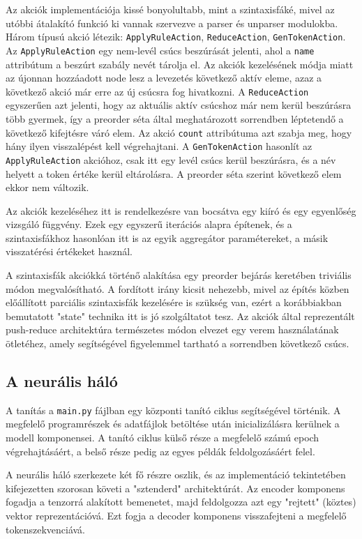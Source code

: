 \documentclass[twoside, 12pt]{report}
\begin{document}
Az akciók implementációja kissé bonyolultabb, mint a szintaxisfáké, mivel az utóbbi átalakító funkció ki vannak szervezve a parser és unparser modulokba. Három típusú akció létezik: \verb|ApplyRuleAction|, \verb|ReduceAction|, \verb|GenTokenAction|. Az \verb|ApplyRuleAction| egy nem-levél csúcs beszúrását jelenti, ahol a \verb|name| attribútum a beszúrt szabály nevét tárolja el. Az akciók kezelésének módja miatt az újonnan hozzáadott node lesz a levezetés következő aktív eleme, azaz a következő akció már erre az új csúcsra fog hivatkozni. A \verb|ReduceAction| egyszerűen azt jelenti, hogy az aktuális aktív csúcshoz már nem kerül beszúrásra több gyermek, így a preorder séta által meghatározott sorrendben léptetendő a következő kifejtésre váró elem. Az akció \verb|count| attribútuma azt szabja meg, hogy hány ilyen visszalépést kell végrehajtani. A \verb|GenTokenAction| hasonlít az \verb|ApplyRuleAction| akcióhoz, csak itt egy levél csúcs kerül beszúrásra, és a név helyett a token értéke kerül eltárolásra. A preorder séta szerint következő elem ekkor nem változik.

Az akciók kezeléséhez itt is rendelkezésre van bocsátva egy kiíró és egy egyenlőség vizsgáló függvény. Ezek egy egyszerű iterációs alapra építenek, és a szintaxisfákhoz hasonlóan itt is az egyik aggregátor paramétereket, a másik visszatérési értékeket használ.

A szintaxisfák akciókká történő alakítása egy preorder bejárás keretében triviális módon megvalósítható. A fordított irány kicsit nehezebb, mivel az építés közben előállított parciális szintaxisfák kezelésére is szükség van, ezért a korábbiakban bemutatott "state" technika itt is jó szolgáltatot tesz. Az akciók által reprezentált push-reduce architektúra természetes módon elvezet egy verem használatának ötletéhez, amely segítségével figyelemmel tartható a sorrendben következő csúcs.

\subsection{A neurális háló}

A tanítás a \verb|main.py| fájlban egy központi tanító ciklus segítségével történik. A megfelelő programrészek és adatfájlok betöltése után inicializálásra kerülnek a modell komponensei. A tanító ciklus külső része a megfelelő számú epoch végrehajtásáért, a belső része pedig az egyes példák feldolgozásáért felel.

A neurális háló szerkezete két fő részre oszlik, és az implementáció tekintetében kifejezetten szorosan követi a "sztenderd" architektúrát. Az encoder komponens fogadja a tenzorrá alakított bemenetet, majd feldolgozza azt egy "rejtett" (köztes) vektor reprezentációvá. Ezt fogja a decoder komponens visszafejteni a megfelelő tokenszekvenciává.
\end{document}
